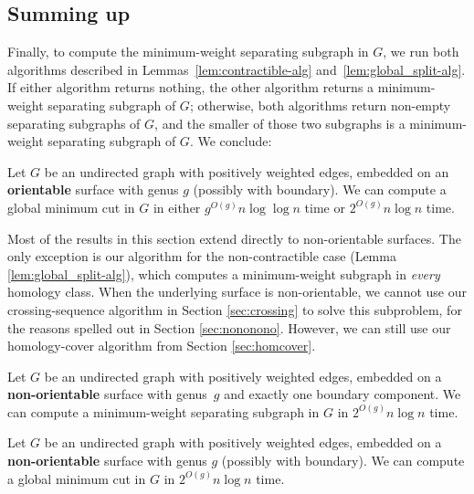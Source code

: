 \documentclass[letterpaper,review]{siamart190516}
\begin{document}
{\subsection{Summing up}

Finally, to compute the minimum-weight separating subgraph in $G$, we run both  algorithms described in Lemmas~\ref{lem:contractible-alg} and~\ref{lem:global_split-alg}.  If either algorithm returns nothing, the other algorithm returns a minimum-weight separating subgraph of $G$; otherwise, both algorithms return non-empty separating subgraphs of $G$, and the smaller of those two subgraphs is a minimum-weight separating subgraph of $G$.  We conclude:

\begin{corollary}
Let $G$ be an undirected graph with positively weighted edges, embedded on an \textbf{orientable} surface with genus $g$ (possibly with boundary).
We can compute a global minimum cut in $G$ in either $g^{O(g)} n \log \log n$ time or $2^{O(g)} n \log n$ time.
\end{corollary}

Most of the results in this section extend directly to non-orientable surfaces.  The only exception is our algorithm for the non-contractible case (Lemma \ref{lem:global_split-alg}), which computes a minimum-weight subgraph in \emph{every} homology class.  When the underlying surface is non-orientable, we cannot use our crossing-sequence algorithm in Section \ref{sec:crossing} to solve this subproblem, for the reasons spelled out in Section \ref{sec:nononono}.  However, we can still use our homology-cover algorithm from Section \ref{sec:homcover}.
 
\begin{theorem}
Let $G$ be an undirected graph with positively weighted edges, embedded on a \textbf{non-orientable} surface with genus~$g$ and exactly one boundary component.
We can compute a minimum-weight separating subgraph in $G$ in $2^{O(g)} n \log n$ time.
\end{theorem}

\begin{corollary}
Let $G$ be an undirected graph with positively weighted edges, embedded on a \textbf{non-orientable} surface with genus $g$ (possibly with boundary).
We can compute a global minimum cut in $G$ in $2^{O(g)} n \log n$ time.
\end{corollary}




}
\end{document}
